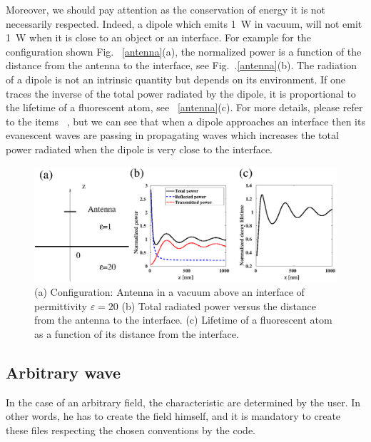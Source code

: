 Moreover, we should pay attention as the conservation of energy it is
not necessarily respected. Indeed, a dipole which emits 1~W in vacuum,
will not emit 1~W when it is close to an object or an interface.  For
example for the configuration shown Fig.~ \ref{antenna}(a), the
normalized power is a function of the distance from the antenna to the
interface, see Fig.~.\ref{antenna}(b). The radiation of a dipole is
not an intrinsic quantity but depends on its environment. If one
traces the inverse of the total power radiated by the dipole, it is
proportional to the lifetime of a fluorescent atom, see~
\ref{antenna}(c). For more details, please refer to the items~
\cite{Rahmani_PRA_97,Rahmani_PRA_01}, but we can see that when a
dipole approaches an interface then its evanescent waves are passing
in propagating waves which increases the total power radiated when the
dipole is very close to the interface.

\begin{figure}[H]
\begin{center}
  \includegraphics*[width=15.0cm,draft=false]{antenna.eps}
\end{center}
\caption{(a) Configuration: Antenna in a vacuum above an interface of
  permittivity $\varepsilon=20$ (b) Total radiated power versus the
  distance from the antenna to the interface. (c) Lifetime of a
  fluorescent atom as a function of its distance from the interface.}
\label{antenne}
\end{figure}




\subsection{Arbitrary wave}

In the case of an arbitrary field, the characteristic are determined
by the user.  In other words, he has to create the field himself, and
it is mandatory to create these files respecting the chosen
conventions by the code.


